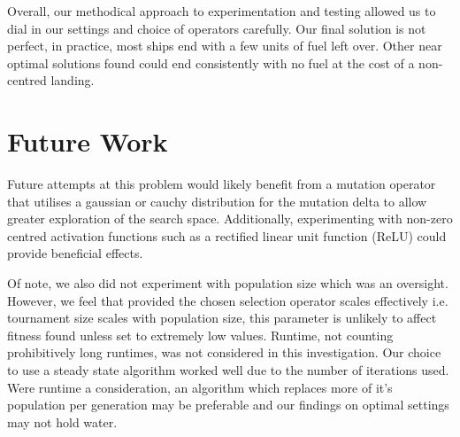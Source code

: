\documentclass[sigconf]{acmart}
\begin{document}
Overall, our methodical approach to experimentation and testing allowed us to dial in our settings and choice of operators carefully. Our final solution is not perfect, in practice, most ships end with a few units of fuel left over. Other near optimal solutions found could end consistently with no fuel at the cost of a non-centred landing.

\section{Future Work}
\label{FutureWork}
Future attempts at this problem would likely benefit from a mutation operator that utilises a gaussian or cauchy distribution for the mutation delta \cite{Chellapilla1998} to allow greater exploration of the search space. Additionally, experimenting with non-zero centred activation functions such as a rectified linear unit function (ReLU) could provide beneficial effects.

Of note, we also did not experiment with population size which was an oversight. However, we feel that provided the chosen selection operator scales effectively i.e. tournament size scales with population size, this parameter is unlikely to affect fitness found unless set to extremely low values.
Runtime, not counting prohibitively long runtimes, was not considered in this investigation. Our choice to use a steady state algorithm worked well due to the number of iterations used. Were runtime a consideration, an algorithm which replaces more of it's population per generation may be preferable and our findings on optimal settings may not hold water.


 
\end{document}
